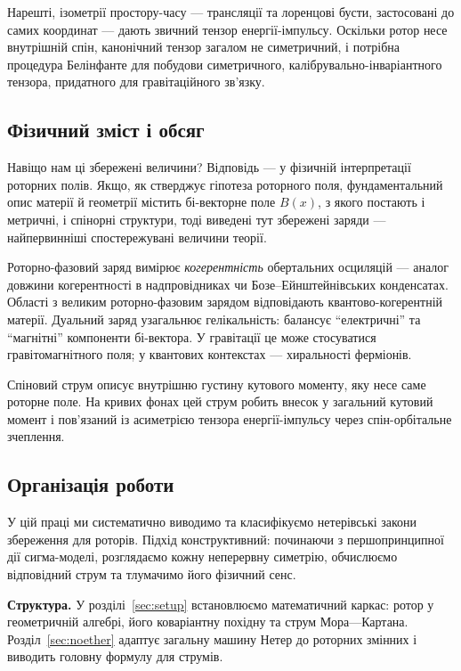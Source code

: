 \documentclass[11pt,a4paper]{article}
\numberwithin{equation}{section}
\theoremstyle{plain}
\theoremstyle{definition}
\theoremstyle{remark}
\begin{document}
Нарешті, ізометрії простору-часу — трансляції та лоренцові бусти, застосовані до самих координат — дають звичний тензор енергії-імпульсу. Оскільки ротор несе внутрішній спін, канонічний тензор загалом не симетричний, і потрібна процедура Белінфанте для побудови симетричного, калібрувально-інваріантного тензора, придатного для гравітаційного зв’язку.

\subsection{Фізичний зміст і обсяг}

Навіщо нам ці збережені величини? Відповідь — у фізичній інтерпретації роторних полів. Якщо, як стверджує гіпотеза роторного поля, фундаментальний опис матерії й геометрії містить бі-векторне поле $B(x)$, з якого постають і метричні, і спінорні структури, тоді виведені тут збережені заряди — найпервинніші спостережувані величини теорії.

Роторно-фазовий заряд вимірює \emph{когерентність} обертальних осциляцій — аналог довжини когерентності в надпровідниках чи Бозе–Ейнштейнівських конденсатах. Області з великим роторно-фазовим зарядом відповідають квантово-когерентній матерії. Дуальний заряд узагальнює гелікальність: балансує “електричні” та “магнітні” компоненти бі-вектора. У гравітації це може стосуватися гравітомагнітного поля; у квантових контекстах — хиральності ферміонів.

Спіновий струм описує внутрішню густину кутового моменту, яку несе саме роторне поле. На кривих фонах цей струм робить внесок у загальний кутовий момент і пов’язаний із асиметрією тензора енергії-імпульсу через спін-орбітальне зчеплення.

\subsection{Організація роботи}

У цій праці ми систематично виводимо та класифікуємо нетерівські закони збереження для роторів. Підхід конструктивний: починаючи з першопринципної дії сигма-моделі, розглядаємо кожну неперервну симетрію, обчислюємо відповідний струм та тлумачимо його фізичний сенс.

\textbf{Структура.} У розділі~\ref{sec:setup} встановлюємо математичний каркас: ротор у геометричній алгебрі, його коваріантну похідну та струм Мора—Картана. Розділ~\ref{sec:noether} адаптує загальну машину Нетер до роторних змінних і виводить головну формулу для струмів.
\end{document}
